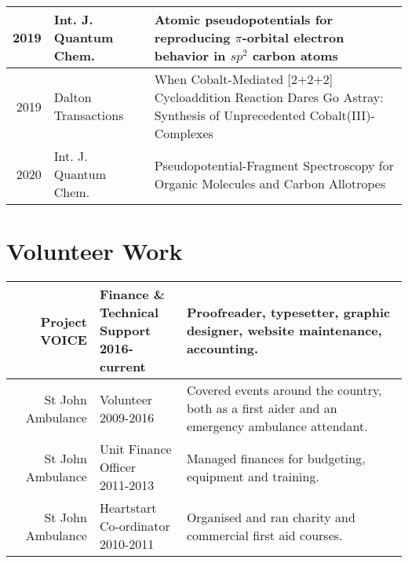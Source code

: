 \documentclass[letterpaper]{deedy-resume-openfont} %
\begin{document}
\begin{minipage}[t]{0.66\textwidth}
\begin{tabular}{rlm{7cm}}
2019 & Int. J. Quantum Chem. & Atomic pseudopotentials for reproducing $\pi$-orbital electron behavior in $sp^2$ carbon atoms \\
\hline
2019 & Dalton Transactions & When Cobalt-Mediated [2+2+2] Cycloaddition Reaction Dares Go Astray: Synthesis of Unprecedented  Cobalt(III)-Complexes \\
\hline
2020 & Int. J. Quantum Chem. & Pseudopotential-Fragment Spectroscopy for Organic Molecules and Carbon Allotropes
\end{tabular}

\sectionspace %
\end{minipage}

\begin{minipage}[t]{\textwidth} %

\section{Volunteer Work} 

\begin{tabular}{rlm{12cm}}
Project VOICE & \makecell[l]{Finance \& \\ Technical Support \\  2016-current} & Proofreader, typesetter, graphic designer, website maintenance, accounting. \\
\hline
St John Ambulance & \makecell[l]{Volunteer \\ 2009-2016} & Covered events around the country, both as a first aider and an emergency ambulance attendant. \\
\hline
St John Ambulance & \makecell[l]{Unit Finance \\ Officer \\ 2011-2013} &
Managed finances for budgeting, equipment and training. \\
\hline
St John Ambulance & \makecell[l]{Heartstart \\ Co-ordinator \\ 2010-2011} &
Organised and ran charity and commercial first aid courses. \\
\end{tabular}



\end{minipage} %
\end{document}
